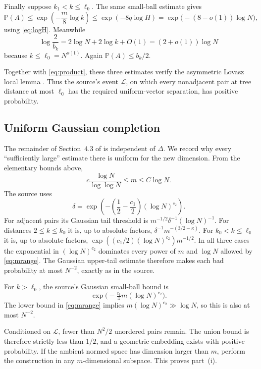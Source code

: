 \documentclass[11pt]{article}
\begin{document}
Finally suppose $k_1<k\leq\ell_0$. The same small-ball estimate gives
\[
 \mathbb P(A)\leq
 \exp\left(-\frac m8\log k\right)
 \leq \exp\left(-8q\log H\right)
 =\exp\big(-(8-o(1))\log N\big),
\]
using \eqref{eq:logH}. Meanwhile
\[
 \log\frac{2}{b_k}=2\log N+2\log k+O(1)
 =(2+o(1))\log N
\]
because $k\leq\ell_0=N^{o(1)}$. Again $\mathbb P(A)\leq b_k/2$.

Together with \eqref{eq:product}, these three estimates verify the asymmetric
Lovasz local lemma \cite{AlonSpencer}. Thus the source's event $\mathcal L$,
on which every nonadjacent pair at tree distance at most $\ell_0$ has the
required uniform-vector separation, has positive probability.

\subsection*{Uniform Gaussian completion}

The remainder of Section~4.3 of \cite{ADTT} is independent of $\Delta$. We
record why every ``sufficiently large'' estimate there is uniform for the new
dimension. From the elementary bounds above,
\begin{equation}\label{eq:mrange}
 c\frac{\log N}{\log\log N}\leq m\leq C\log N.
\end{equation}
The source uses
\[
 \delta=\exp\left(-\left(\frac12-\frac{c_1}{2}\right)(\log N)^{c_2}\right).
\]
For adjacent pairs its Gaussian tail threshold is
$m^{-1/2}\delta^{-1}(\log N)^{-1}$. For distances $2\leq k\leq k_0$ it is,
up to absolute factors, $\delta^{-1}m^{-(3/2-\kappa)}$. For
$k_0<k\leq\ell_0$ it is, up to absolute factors,
$\exp((c_1/2)(\log N)^{c_2})m^{-1/2}$. In all three cases the exponential in
$(\log N)^{c_2}$ dominates every power of $m$ and $\log N$ allowed by
\eqref{eq:mrange}. The Gaussian upper-tail estimate therefore makes each bad
probability at most $N^{-2}$, exactly as in the source.

For $k>\ell_0$, the source's Gaussian small-ball bound is
\[
 \exp\big(-\tfrac{c_1}{4}m(\log N)^{c_2}\big).
\]
The lower bound in \eqref{eq:mrange} implies
$m(\log N)^{c_2}\gg\log N$, so this is also at most $N^{-2}$.

Conditioned on $\mathcal L$, fewer than $N^2/2$ unordered pairs remain. The
union bound is therefore strictly less than $1/2$, and a geometric embedding
exists with positive probability. If the ambient normed space has dimension
larger than $m$, perform the construction in any $m$-dimensional subspace.
This proves part~(i).
\end{document}

